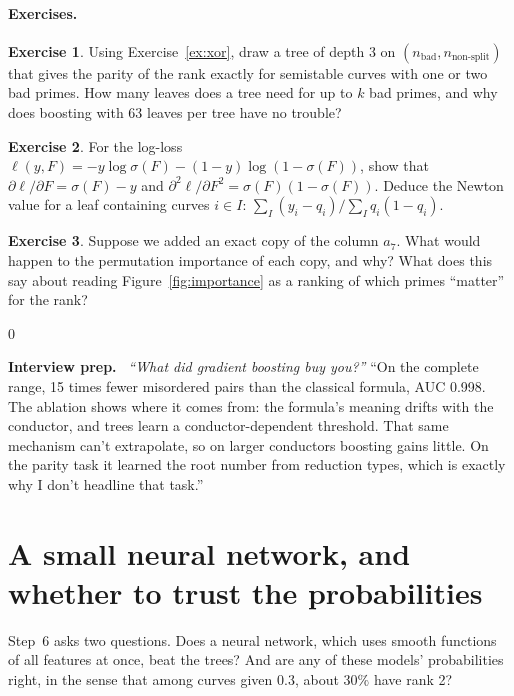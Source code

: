 \documentclass[11pt]{article}
\theoremstyle{definition}
\newtheorem{exercise}{Exercise}[section]
\theoremstyle{plain}
\theoremstyle{remark}
\renewcommand{\_}{\oldunderscore\allowbreak}
\newenvironment{interview}
  {\par\medskip\noindent\begin{lrbox}{0}\begin{minipage}{\dimexpr\linewidth-2\fboxsep-2\fboxrule\relax}
   \textbf{Interview prep.}\ }
  {\end{minipage}\end{lrbox}\fcolorbox{blue!40!black}{interviewbg}{\usebox{0}}\par\medskip}
\begin{document}
\paragraph{Exercises.}
\begin{exercise}\label{ex:tree-parity}
Using Exercise~\ref{ex:xor}, draw a tree of depth 3 on $(n_{\text{bad}},n_{\text{non-split}})$
that gives the parity of the rank exactly for semistable curves with one or two bad primes. How
many leaves does a tree need for up to $k$ bad primes, and why does boosting with 63 leaves
per tree have no trouble?
\end{exercise}
\begin{exercise}\label{ex:newton}
For the log-loss $\ell(y,F)=-y\log\sigma(F)-(1-y)\log(1-\sigma(F))$, show that
$\partial\ell/\partial F=\sigma(F)-y$ and $\partial^2\ell/\partial F^2=\sigma(F)(1-\sigma(F))$.
Deduce the Newton value for a leaf containing curves $i\in I$:
$\sum_I(y_i-q_i)/\sum_Iq_i(1-q_i)$.
\end{exercise}
\begin{exercise}\label{ex:perm}
Suppose we added an exact copy of the column $a_7$. What would happen to the permutation
importance of each copy, and why? What does this say about reading Figure~\ref{fig:importance}
as a ranking of which primes ``matter'' for the rank?
\end{exercise}

\begin{interview}
\emph{``What did gradient boosting buy you?''} ``On the complete range, 15 times fewer misordered
pairs than the classical formula, AUC 0.998. The ablation shows where it comes from: the
formula's meaning drifts with the conductor, and trees learn a conductor-dependent threshold.
That same mechanism can't extrapolate, so on larger conductors boosting gains little. On the
parity task it learned the root number from reduction types, which is exactly why I don't
headline that task.''
\end{interview}

\section{A small neural network, and whether to trust the probabilities}
\label{sec:mlp}

Step~6 asks two questions. Does a neural network, which uses smooth functions of all features
at once, beat the trees? And are any of these models' probabilities right, in the sense that
among curves given $0.3$, about $30\%$ have rank 2?
\end{document}
